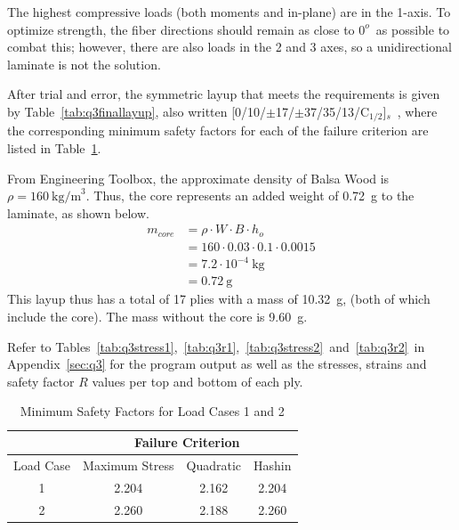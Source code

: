 \documentclass{SelimArticle}
\begin{document}
The highest compressive loads (both moments and in-plane) are in the 1-axis. To optimize strength, the fiber directions should remain as close to $0^o$~as possible to combat this; however, there are also loads in the 2 and 3 axes, so a unidirectional laminate is not the solution.

After trial and error, the symmetric layup that meets the requirements is given by Table~\ref{tab:q3finallayup}, also written [0/10/$\pm$17/$\pm$37/35/13/C$_{1/2}$]$_{s}$~, where the corresponding minimum safety factors for each of the failure criterion are listed in Table~\ref{tab:q3finalR}.

From Engineering Toolbox, the approximate density of Balsa Wood is $\rho = 160~\text{kg/m}^{3}$. Thus, the core represents an added weight of 0.72~g to the laminate, as shown below. 
\begin{align*}
m_{core} &= \rho \cdot W \cdot B \cdot h_{o} \\
&= 160 \cdot 0.03 \cdot 0.1 \cdot 0.0015 \\
&= 7.2 \cdot 10^{-4}~\text{kg} \\
&= 0.72~\text{g}
\end{align*} 
This layup thus has a total of 17 plies with a mass of 10.32~g, (both of which include the core). The mass without the core is 9.60~g.

Refer to Tables~\ref{tab:q3stress1},~\ref{tab:q3r1},~\ref{tab:q3stress2}~and~\ref{tab:q3r2}~in Appendix~\ref{sec:q3} for the program output as well as the stresses, strains and safety factor $R$ values per top and bottom of each ply.
\begin{table}[H]
\centering
\caption{Minimum Safety Factors for Load Cases 1 and 2} \label{tab:q3finalR}
\begin{tabular}{|c|ccc|}
\hline
           & \multicolumn{ 3}{|c|}{Failure Criterion} \\
\hline
 Load Case & Maximum Stress &  Quadratic &     Hashin \\
\hline
         1 &      2.204 &      2.162 &      2.204 \\

         2 &      2.260 &      2.188 &      2.260 \\
\hline
\end{tabular} 
\end{table} 
 	
\newpage
\appendix



\end{document}
